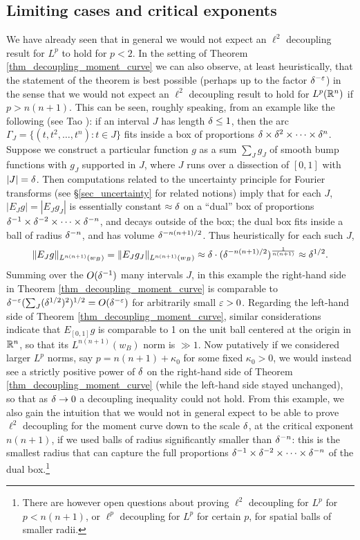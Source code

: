 \documentclass[brochure,english,12pt]{bourbaki}%
\begin{document}
\subsection{Limiting cases and critical exponents}\label{sec_an_heur}
We have already seen that in general we would not expect an $\ell^2$ decoupling result for $L^p$ to hold for $p<2$. In the setting of Theorem \ref{thm_decoupling_moment_curve} we can also observe, at least heuristically, that the statement of the theorem is best possible (perhaps up to the factor $\delta^{-\varepsilon}$) in the sense that we would not expect an $\ell^2$ decoupling result to hold for $L^p(\mathbb{R}^{n})$ if $p > n(n+1)$. This can be seen, roughly speaking, from an example like the following (see Tao \cite{Tao15ablog}): if an interval $J$ has length $\delta \leq 1$, then the arc $\Gamma_J = \{ (t,t^2,\ldots, t^n) : t \in J\}$ fits inside a box of proportions $\delta \times \delta^2 \times \cdots \times \delta^n$. Suppose we construct a particular function $g$ as a sum $\sum_J g_J$ of smooth bump functions with $g_J$ supported in $J$, where $J$ runs over a dissection of $[0,1]$ with $|J|=\delta$. Then computations related to the uncertainty principle for Fourier transforms (see \S \ref{sec_uncertainty} for related notions) imply that for each $J$, $|E_Jg| = |E_Jg_J|$ is essentially  constant $\approx \delta$ on a ``dual'' box of proportions $\delta^{-1} \times \delta^{-2} \times \cdots \times \delta^{-n}$, and decays outside of the box; the dual box fits inside a ball of radius $\delta^{-n}$, and has volume $\delta^{-n(n+1)/2}$.
Thus heuristically for each such $J$, 
\[
 \|E_J g\|_{L^{n(n+1)}(w_B)} = \|E_J g_J\|_{L^{n(n+1)}(w_B)}
	\approx \delta \cdot (\delta^{-n(n+1)/2})^{\frac{1}{n(n+1)}} \approx \delta^{1/2}.
\]
	Summing over the $O(\delta^{-1})$ many intervals $J$, in this example the right-hand side in Theorem \ref{thm_decoupling_moment_curve} is comparable to $\delta^{-\varepsilon}(\sum_J (\delta^{1/2})^2)^{1/2}  = O(\delta^{-\varepsilon})$ for arbitrarily small $\varepsilon>0$.
Regarding the left-hand side of Theorem \ref{thm_decoupling_moment_curve}, similar considerations indicate that $E_{[0,1]}g$ is comparable to 1 on the unit ball centered at the origin in $\mathbb{R}^n$, so that its $L^{n(n+1)}(w_B)$ norm is $\gg 1$. Now putatively if we considered larger $L^p$ norms, say $p= n(n+1) +\kappa_0$ for some fixed $\kappa_0>0$, we would instead see a strictly positive power of $\delta$ on the right-hand side of Theorem \ref{thm_decoupling_moment_curve} (while the left-hand side stayed unchanged), so that as $\delta \rightarrow 0$ a decoupling inequality could not hold.
From this example, we also gain the intuition that we would not in general expect to be able to prove $\ell^2$ decoupling for the moment curve down to the scale $\delta$, at the critical exponent $n(n+1)$, if we used balls of radius significantly smaller than $\delta^{-n}$: this is the smallest radius that can capture the full proportions $\delta^{-1} \times \delta^{-2} \times \cdots \times \delta^{-n}$ of the dual box.\footnote{There are however open questions about proving $\ell^2$ decoupling for $L^p$ for $p< n(n+1)$, or $\ell^p$ decoupling for $L^p$ for certain $p$, for spatial balls of smaller radii.}
\end{document}
